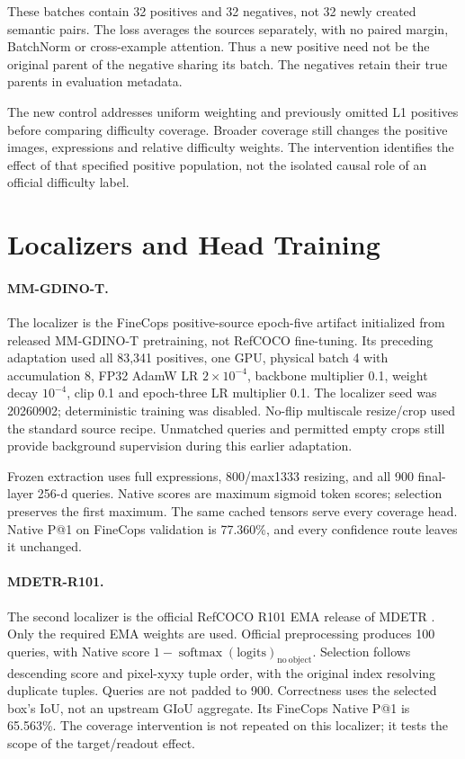 \documentclass[10pt,twocolumn,letterpaper]{article}
\begin{document}
These batches contain 32 positives and 32 negatives, not 32 newly created
semantic pairs. The loss averages the sources separately, with no paired
margin, BatchNorm or cross-example attention. Thus a new positive need not be
the original parent of the negative sharing its batch. The negatives retain
their true parents in evaluation metadata.

The new control addresses uniform weighting and previously omitted L1
positives before comparing difficulty coverage. Broader coverage still changes
the positive images, expressions and relative difficulty weights. The
intervention identifies the effect of that specified positive population,
not the isolated causal role of an official difficulty label.

\section{Localizers and Head Training}
\paragraph{MM-GDINO-T.}
The localizer is the FineCops positive-source epoch-five artifact initialized
from released MM-GDINO-T pretraining, not RefCOCO fine-tuning. Its preceding
adaptation used all 83,341 positives, one GPU, physical batch 4 with accumulation 8,
FP32 AdamW LR $2\times10^{-4}$, backbone multiplier 0.1, weight decay $10^{-4}$,
clip 0.1 and epoch-three LR multiplier 0.1. The localizer seed was 20260902;
deterministic training was disabled. No-flip multiscale resize/crop used the
standard source recipe. Unmatched queries and permitted empty crops still
provide background supervision during this earlier adaptation.

Frozen extraction uses full expressions, 800/max1333 resizing, and all 900
final-layer 256-d queries. Native scores are maximum sigmoid token scores;
selection preserves the first maximum. The same cached tensors serve every
coverage head. Native P@1 on FineCops validation is 77.360\%, and every
confidence route leaves it unchanged.

\paragraph{MDETR-R101.}
The second localizer is the official RefCOCO R101 EMA release of MDETR
\cite{kamath2021mdetr}. Only the required EMA weights are used. Official
preprocessing produces 100 queries, with Native score
$1-\operatorname{softmax}(\mathrm{logits})_{\mathrm{no\ object}}$.
Selection follows descending score and pixel-xyxy tuple order, with the
original index resolving duplicate tuples. Queries are not padded to 900.
Correctness uses the selected box's IoU, not an upstream GIoU aggregate.
Its FineCops Native P@1 is 65.563\%. The coverage intervention is not repeated
on this localizer; it tests the scope of the target/readout effect.
\end{document}
